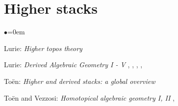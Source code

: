 \section{Higher stacks}
\label{section-higher-stacks}

\begin{list}{$\bullet$}{\leftmargin=0em}
\item Lurie: \emph{Higher topos theory} \cite{lurie_topos}
\smallskip
\item Lurie: \emph{Derived Algebraic Geometry I - V}
\cite{dag1}, \cite{dag2}, \cite{dag3}, \cite{dag4}, \cite{dag5}
\smallskip
\item To\"en: \emph{Higher and derived stacks: a global overview}
\cite{toen_higher}
\smallskip
\item To\"en and Vezzosi:  \emph{Homotopical algebraic geometry I, II}
\cite{hag1}, \cite{hag2}
\end{list}








